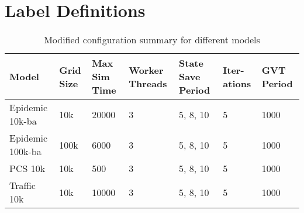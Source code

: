 \section{Label Definitions}
\begin{table}[h]
\centering
\footnotesize
\begin{tabularx}{\textwidth}{|l|X|X|X|X|X|X|}
\hline
\textbf{Model} & \textbf{Grid Size} & \textbf{Max Sim Time} & \textbf{Worker Threads} & \textbf{State Save Period} & \textbf{Iter-ations} & \textbf{GVT Period} \\
\hline
Epidemic 10k-ba & 10k & 20000 & 3 & 5, 8, 10 & 5 & 1000 \\
\hline
Epidemic 100k-ba & 100k & 6000 & 3 & 5, 8, 10 & 5 & 1000 \\
\hline
PCS 10k & 10k & 500 & 3 & 5, 8, 10 & 5 & 1000 \\
\hline
Traffic 10k & 10k & 10000 & 3 & 5, 8, 10 & 5 & 1000 \\
\hline
\end{tabularx}
\caption{Modified configuration summary for different models}
\label{table:modified_model_configs}
\end{table}
\newpage
\newpage

